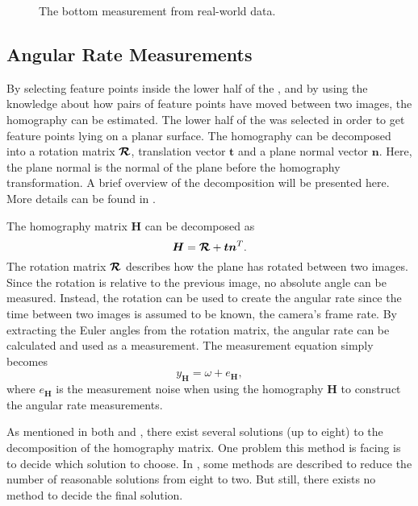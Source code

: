 \begin{figure}[!ht]
	\centering
	\caption{\label{fig:roibottom} The \abbrROI bottom measurement from real-world data.}
\end{figure}

\newpage

\subsection{Angular Rate Measurements}
\label{sec:angratemeas}
By selecting feature points inside the lower half of the \abbrROI, and by using the knowledge about how pairs of feature points have moved between two images, the homography can be estimated.
The lower half of the \abbrROI was selected in order to get feature points lying on a planar surface.
The homography can be decomposed into a rotation matrix $\bm{\mathcal{R}}$, translation vector $\bm{t}$ and a plane normal vector $\bm{n}$.
Here, the plane normal is the normal of the plane before the homography transformation.
A brief overview of the decomposition will be presented here.
More details can be found in \cite{Malis:2007}.

The homography matrix $\bm{H}$ can be decomposed as
%
\begin{equation}
    \bm{H} = \bm{\mathcal{R}} + \bm{t} \bm{n}^T.
\end{equation}
%
The rotation matrix $\bm{\mathcal{R}}$ describes how the plane has rotated between two images.
Since the rotation is relative to the previous image, no absolute angle can be measured.
Instead, the rotation can be used to create the angular rate since the time between two images is assumed to be known, \ie the camera's frame rate.
By extracting the Euler angles from the rotation matrix, the angular rate can be calculated and used as a measurement.
The measurement equation simply becomes
%
\begin{equation}
	y_{\bm{H}} = \omega + e_{\bm{H}},
\end{equation}
%
where $e_{\bm{H}}$ is the measurement noise when using the homography $\bm{H}$ to construct the angular rate measurements.

As mentioned in both \cite{Gabb:2013} and \cite{Malis:2007}, there exist several solutions (up to eight) to the decomposition of the homography matrix.
One problem this method is facing is to decide which solution to choose.
In \cite{Malis:2007}, some methods are described to reduce the number of reasonable solutions from eight to two.
But still, there exists no method to decide the final solution.

